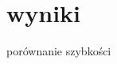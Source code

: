 \documentclass[12pt]{article}
\begin{document}
\section{wyniki}
porównanie szybkości





\newpage
\cite{instrukcja}
\renewcommand\refname{Bibliografia}


\end{document}
